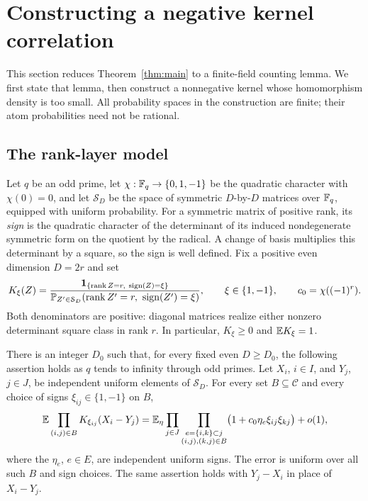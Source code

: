 \section{Constructing a negative kernel correlation}
\label{sec:kernel}

This section reduces Theorem~\ref{thm:main} to a finite-field counting
lemma. We first state that lemma, then construct a nonnegative kernel
whose homomorphism density is too small. All probability spaces in
the construction are finite; their atom probabilities need not be
rational.

\subsection{The rank-layer model}

Let $q$ be an odd prime, let $\chi:\mathbb F_q\to\{0,1,-1\}$ be the
quadratic character with $\chi(0)=0$, and let $\mathcal S_D$ be the
space of symmetric $D$-by-$D$ matrices over $\mathbb F_q$, equipped with
uniform probability. For a symmetric matrix of positive rank, its
\emph{sign} is the quadratic character of the determinant of its
induced nondegenerate symmetric form on the quotient by the radical.
A change of basis multiplies this determinant by a square, so the
sign is well defined. Fix a positive even dimension $D=2r$ and set
\begin{equation}
 K_\xi(Z)=
 \frac{\mathbf 1_{\{\operatorname{rank} Z=r,\ \operatorname{sign}(Z)=\xi\}}}
 {\mathbb P_{Z'\in\mathcal S_D}(\operatorname{rank} Z'=r,\ \operatorname{sign}(Z')=\xi)},
 \qquad \xi\in\{1,-1\},\qquad c_0=\chi((-1)^r).
 \label{eq:kernel-rank-definition}
\end{equation}
Both denominators are positive: diagonal matrices realize either
nonzero determinant square class in rank $r$. In particular,
$K_\xi\ge0$ and $\mathbb E K_\xi=1$.

\begin{lemma}
\label{lem:rank-layer}
There is an integer $D_0$ such that, for every fixed even $D\ge D_0$,
the following assertion holds as $q$ tends to infinity through odd
primes. Let $X_i$, $i\in I$, and $Y_j$, $j\in J$, be independent
uniform elements of $\mathcal S_D$. For every set
$B\subseteq\mathscr C$ and every choice of signs
$\xi_{ij}\in\{1,-1\}$ on $B$,
\begin{equation}
 \mathbb E\prod_{(i,j)\in B}K_{\xi_{ij}}(X_i-Y_j)
 =\mathbb E_\eta\prod_{j\in J}
 \prod_{\substack{e=\{i,k\}\subset j\\(i,j),(k,j)\in B}}
 \bigl(1+c_0\eta_e\xi_{ij}\xi_{kj}\bigr)+o(1),
 \label{eq:rank-layer}
\end{equation}
where the $\eta_e$, $e\in E$, are independent uniform signs. The error
is uniform over all such $B$ and sign choices. The same assertion
holds with $Y_j-X_i$ in place of $X_i-Y_j$.
\end{lemma}

